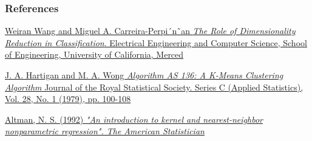                                                                                                                                   \begin{thebibliography}{}
                                                                                                                                  \subsubsection{References}
                                                                                                                                  \href{https://pdfs.semanticscholar.org/d38a/ebe336e5f0635586e350fafd92883c05591c.pdf}{Weiran Wang and Miguel A. Carreira-Perpi´n˜an
                                                                                                                                  \textit{The Role of Dimensionality Reduction in Classification}. 
                                                                                                                                  Electrical Engineering and Computer Science, School of Engineering, University of California, Merced}

                                                                                                                                  \href{http://www.labri.fr/perso/bpinaud/userfiles/downloads/hartigan_1979_kmeans.pdf}{J. A. Hartigan and M. A. Wong
                                                                                                                                  \textit{Algorithm AS 136: A K-Means Clustering Algorithm}
                                                                                                                                  Journal of the Royal Statistical Society. Series C (Applied Statistics), Vol. 28, No. 1 (1979), pp. 100-108}

                                                                                                                                  \href{https://www.tandfonline.com/doi/abs/10.1080/00031305.1992.10475879}{Altman, N. S. (1992)
                                                                                                                                  \textit{"An introduction to kernel and nearest-neighbor nonparametric regression". The American Statistician}}


\end{thebibliography}
